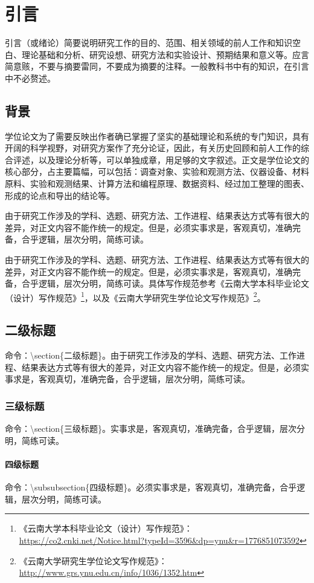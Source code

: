 \chapter{引言}
\label{cha:intro}

引言（或绪论）简要说明研究工作的目的、范围、相关领域的前人工作和知识空白、理论基础和分析、研究设想、研究方法和实验设计、预期结果和意义等。应言简意赅，不要与摘要雷同，不要成为摘要的注释。一般教科书中有的知识，在引言中不必赘述。

\section{背景}

学位论文为了需要反映出作者确已掌握了坚实的基础理论和系统的专门知识，具有开阔的科学视野，对研究方案作了充分论证，因此，有关历史回顾和前人工作的综合评述，以及理论分析等，可以单独成章，用足够的文字叙述。正文是学位论文的核心部分，占主要篇幅，可以包括：调查对象、实验和观测方法、仪器设备、材料原料、实验和观测结果、计算方法和编程原理、数据资料、经过加工整理的图表、形成的论点和导出的结论等。


由于研究工作涉及的学科、选题、研究方法、工作进程、结果表达方式等有很大的差异，对正文内容不能作统一的规定。但是，必须实事求是，客观真切，准确完备，合乎逻辑，层次分明，简练可读。

由于研究工作涉及的学科、选题、研究方法、工作进程、结果表达方式等有很大的差异，对正文内容不能作统一的规定。但是，必须实事求是，客观真切，准确完备，合乎逻辑，层次分明，简练可读。具体写作规范参考《云南大学本科毕业论文（设计）写作规范》\footnote{《云南大学本科毕业论文（设计）写作规范》：\url{https://co2.cnki.net/Notice.html?typeId=3596\&dp=ynu\&r=1776851073592}}，以及《云南大学研究生学位论文写作规范》\footnote{《云南大学研究生学位论文写作规范》：\url{http://www.grs.ynu.edu.cn/info/1036/1352.htm}}。




\section{二级标题}

命令：\textbackslash section\{二级标题\}。由于研究工作涉及的学科、选题、研究方法、工作进程、结果表达方式等有很大的差异，对正文内容不能作统一的规定。但是，必须实事求是，客观真切，准确完备，合乎逻辑，层次分明，简练可读。



\subsection{三级标题}

命令：\textbackslash section\{三级标题\}。实事求是，客观真切，准确完备，合乎逻辑，层次分明，简练可读。

\subsubsection{四级标题}

命令：\textbackslash subsubsection\{四级标题\}。必须实事求是，客观真切，准确完备，合乎逻辑，层次分明，简练可读。
